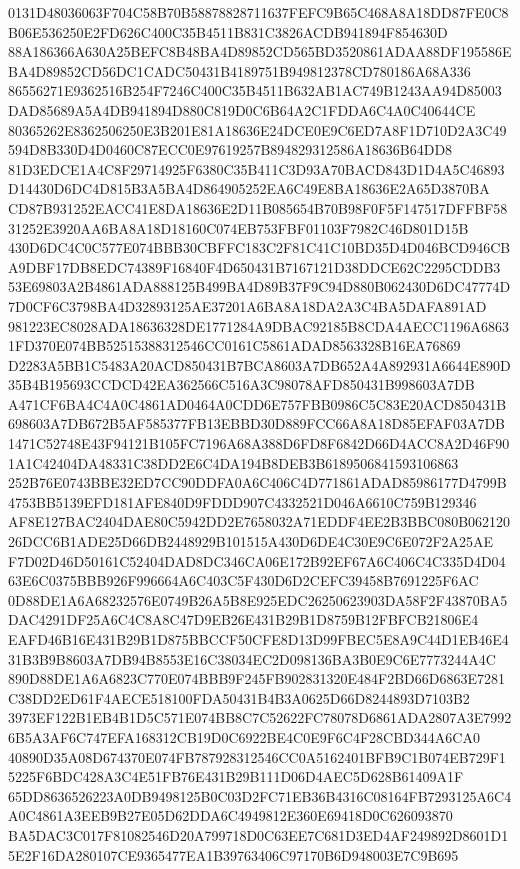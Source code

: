 \documentclass[UTF8,fontset=fandol,zihao=-4,a4paper]{ctexart}
\begin{document}
{{0131D48036063F704C58B70B58878828711637FEFC9B65C468A8A18DD87FE0C8B06E536250E2FD626C400C35B4511B831C3826ACDB941894F854630D
88A186366A630A25BEFC8B48BA4D89852CD565BD3520861ADAA88DF195586EBA4D89852CD56DC1CADC50431B4189751B949812378CD780186A68A336
86556271E9362516B254F7246C400C35B4511B632AB1AC749B1243AA94D85003DAD85689A5A4DB941894D880C819D0C6B64A2C1FDDA6C4A0C40644CE
80365262E8362506250E3B201E81A18636E24DCE0E9C6ED7A8F1D710D2A3C49594D8B330D4D0460C87ECC0E97619257B894829312586A18636B64DD8
81D3EDCE1A4C8F29714925F6380C35B411C3D93A70BACD843D1D4A5C46893D14430D6DC4D815B3A5BA4D864905252EA6C49E8BA18636E2A65D3870BA
CD87B931252EACC41E8DA18636E2D11B085654B70B98F0F5F147517DFFBF5831252E3920AA6BA8A18D18160C074EB753FBF01103F7982C46D801D15B
430D6DC4C0C577E074BBB30CBFFC183C2F81C41C10BD35D4D046BCD946CBA9DBF17DB8EDC74389F16840F4D650431B7167121D38DDCE62C2295CDDB3
53E69803A2B4861ADA888125B499BA4D89B37F9C94D880B062430D6DC47774D7D0CF6C3798BA4D32893125AE37201A6BA8A18DA2A3C4BA5DAFA891AD
981223EC8028ADA18636328DE1771284A9DBAC92185B8CDA4AECC1196A68631FD370E074BB52515388312546CC0161C5861ADAD8563328B16EA76869
D2283A5BB1C5483A20ACD850431B7BCA8603A7DB652A4A892931A6644E890D35B4B195693CCDCD42EA362566C516A3C98078AFD850431B998603A7DB
A471CF6BA4C4A0C4861AD0464A0CDD6E757FBB0986C5C83E20ACD850431B698603A7DB672B5AF585377FB13EBBD30D889FCC66A8A18D85EFAF03A7DB
1471C52748E43F94121B105FC7196A68A388D6FD8F6842D66D4ACC8A2D46F901A1C42404DA48331C38DD2E6C4DA194B8DEB3B6189506841593106863
252B76E0743BBE32ED7CC90DDFA0A6C406C4D771861ADAD85986177D4799B4753BB5139EFD181AFE840D9FDDD907C4332521D046A6610C759B129346
AF8E127BAC2404DAE80C5942DD2E7658032A71EDDF4EE2B3BBC080B06212026DCC6B1ADE25D66DB2448929B101515A430D6DE4C30E9C6E072F2A25AE
F7D02D46D50161C52404DAD8DC346CA06E172B92EF67A6C406C4C335D4D0463E6C0375BBB926F996664A6C403C5F430D6D2CEFC39458B7691225F6AC
0D88DE1A6A68232576E0749B26A5B8E925EDC26250623903DA58F2F43870BA5DAC4291DF25A6C4C8A8C47D9EB26E431B29B1D8759B12FBFCB21806E4
EAFD46B16E431B29B1D875BBCCF50CFE8D13D99FBEC5E8A9C44D1EB46E431B3B9B8603A7DB94B8553E16C38034EC2D098136BA3B0E9C6E7773244A4C
890D88DE1A6A6823C770E074BBB9F245FB902831320E484F2BD66D6863E7281C38DD2ED61F4AECE518100FDA50431B4B3A0625D66D8244893D7103B2
3973EF122B1EB4B1D5C571E074BB8C7C52622FC78078D6861ADA2807A3E79926B5A3AF6C747EFA168312CB19D0C6922BE4C0E9F6C4F28CBD344A6CA0
40890D35A08D674370E074FB787928312546CC0A5162401BFB9C1B074EB729F15225F6BDC428A3C4E51FB76E431B29B111D06D4AEC5D628B61409A1F
65DD8636526223A0DB9498125B0C03D2FC71EB36B4316C08164FB7293125A6C4A0C4861A3EEB9B27E05D62DDA6C4949812E360E69418D0C626093870
BA5DAC3C017F81082546D20A799718D0C63EE7C681D3ED4AF249892D8601D15E2F16DA280107CE9365477EA1B39763406C97170B6D948003E7C9B695
}}
\end{document}
